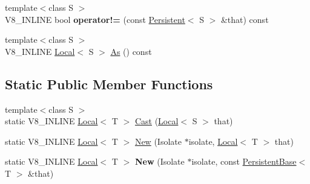 \begin{DoxyCompactItemize}
\item 
\mbox{\label{classv8_1_1Local_a8c75d7c45f0d922f3dd842f96fb5c5cf}} 
{\footnotesize template$<$class S $>$ }\\V8\+\_\+\+I\+N\+L\+I\+NE bool {\bfseries operator!=} (const \mbox{\hyperlink{classv8_1_1Persistent}{Persistent}}$<$ S $>$ \&that) const
\item 
{\footnotesize template$<$class S $>$ }\\V8\+\_\+\+I\+N\+L\+I\+NE \mbox{\hyperlink{classv8_1_1Local}{Local}}$<$ S $>$ \mbox{\hyperlink{classv8_1_1Local_afa242d21780a729341644a615c4e6ea1}{As}} () const
\end{DoxyCompactItemize}
\subsection*{Static Public Member Functions}
\begin{DoxyCompactItemize}
\item 
{\footnotesize template$<$class S $>$ }\\static V8\+\_\+\+I\+N\+L\+I\+NE \mbox{\hyperlink{classv8_1_1Local}{Local}}$<$ T $>$ \mbox{\hyperlink{classv8_1_1Local_a95c8aa28ad098dd160ddd8cb60377bd6}{Cast}} (\mbox{\hyperlink{classv8_1_1Local}{Local}}$<$ S $>$ that)
\item 
static V8\+\_\+\+I\+N\+L\+I\+NE \mbox{\hyperlink{classv8_1_1Local}{Local}}$<$ T $>$ \mbox{\hyperlink{classv8_1_1Local_a1b3c386fb10d9e8f67aecec9174de1fa}{New}} (Isolate $\ast$isolate, \mbox{\hyperlink{classv8_1_1Local}{Local}}$<$ T $>$ that)
\item 
\mbox{\label{classv8_1_1Local_a9ffe326224dc9b8a0b47d61b1f877741}} 
static V8\+\_\+\+I\+N\+L\+I\+NE \mbox{\hyperlink{classv8_1_1Local}{Local}}$<$ T $>$ {\bfseries New} (Isolate $\ast$isolate, const \mbox{\hyperlink{classv8_1_1PersistentBase}{Persistent\+Base}}$<$ T $>$ \&that)
\end{DoxyCompactItemize}
